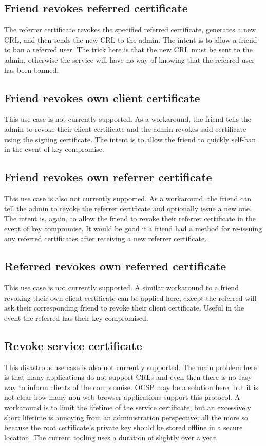 \documentclass{article}
\begin{document}
\subsection{Friend revokes referred certificate}
\label{revoke-referred}
The referrer certificate revokes the specified referred certificate, generates a new CRL, and then sends the new CRL to the admin.  The intent is to allow a friend to ban a referred user.  The trick here is that the new CRL must be sent to the admin, otherwise the service will have no way of knowing that the referred user has been banned.

\subsection{Friend revokes own client certificate}
\label{friend-revoke-friend}
This use case is not currently supported.  As a workaround, the friend tells the admin to revoke their client certificate and the admin revokes said certificate using the signing certificate.  The intent is to allow the friend to quickly self-ban in the event of key-compromise.

\subsection{Friend revokes own referrer certificate}
\label{friend-revoke-referred}
This use case is also not currently supported.  As a workaround, the friend can tell the admin to revoke the referrer certificate and optionally issue a new one.  The intent is, again, to allow the friend to revoke their referrer certificate in the event of key compromise.  It would be good if a friend had a method for re-issuing any referred certificates after receiving a new referrer certificate.

\subsection{Referred revokes own referred certificate}
\label{referred-revoke-referred}
This use case is not currently supported.  A similar workaround to a friend revoking their own client certificate can be applied here, except the referred will ask their corresponding friend to revoke their client certificate.  Useful in the event the referred has their key compromised.

\subsection{Revoke service certificate}
\label{revoke-service}
This disastrous use case is also not currently supported.  The main problem here is that many applications do not support CRLs and even then there is no easy way to inform clients of the compromise.  OCSP may be a solution here, but it is not clear how many non-web browser applications support this protocol.  A workaround is to limit the lifetime of the service certificate, but an excessively short lifetime is annoying from an administration perspective; all the more so because the root certificate's private key should be stored offline in a secure location.  The current tooling uses a duration of slightly over a year.
\end{document}

